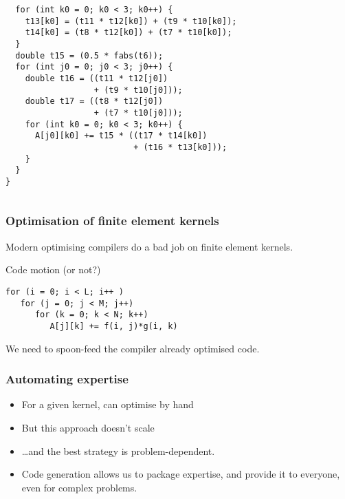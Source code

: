 \documentclass[presentation]{beamer}
\begin{document}
\begin{frame}[fragile]
\begin{overlayarea}{\textwidth}{0.8\textheight}
\begin{onlyenv}
\begin{columns}
      \begin{column}{0.5\textwidth}
\begin{verbatim}
  for (int k0 = 0; k0 < 3; k0++) {
    t13[k0] = (t11 * t12[k0]) + (t9 * t10[k0]);
    t14[k0] = (t8 * t12[k0]) + (t7 * t10[k0]);
  }
  double t15 = (0.5 * fabs(t6));
  for (int j0 = 0; j0 < 3; j0++) {
    double t16 = ((t11 * t12[j0])
                  + (t9 * t10[j0]));
    double t17 = ((t8 * t12[j0])
                  + (t7 * t10[j0]));
    for (int k0 = 0; k0 < 3; k0++) {
      A[j0][k0] += t15 * ((t17 * t14[k0])
                          + (t16 * t13[k0]));
    }
  }
}
\end{verbatim}
      \end{column}
    \end{columns}
  \end{onlyenv}
  \end{overlayarea}
\end{frame}

\begin{frame}[fragile]
  \frametitle{Optimisation of finite element kernels}
  
  \begin{problem}
    Modern optimising compilers do a bad job on finite element
    kernels.
  \end{problem}
  \begin{exampleblock}{Code motion (or not?)}
\begin{verbatim}
for (i = 0; i < L; i++ )
   for (j = 0; j < M; j++)
      for (k = 0; k < N; k++)
         A[j][k] += f(i, j)*g(i, k)
\end{verbatim}
  \end{exampleblock}
  \begin{corollary}
    We need to spoon-feed the compiler already optimised code.
  \end{corollary}
\end{frame}

\begin{frame}
  \frametitle{Automating expertise}
  \begin{itemize}
  \item For a given kernel, can optimise by hand
  \item But this approach doesn't scale
  \item \ldots and the best strategy is problem-dependent.
  \item Code generation allows us to package expertise, and provide it
    to everyone, even for complex problems.
  \end{itemize}
\end{frame}
\end{document}
